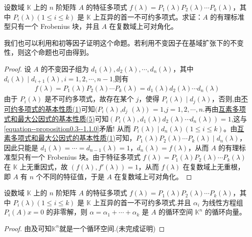 \documentclass[../../main.tex]{subfiles}
\begin{document}
\begin{proposition}\label{proposition:特征多项式在数域K上的不可约分解则在复数域上可对角化}
设数域 $\mathbb{K}$ 上的 $n$ 阶矩阵 $A$ 的特征多项式 $f(\lambda)=P_1(\lambda)P_2(\lambda)\cdots P_k(\lambda)$，其中 $P_i(\lambda) (1\leq i\leq k)$ 是 $\mathbb{K}$ 上互异的首一不可约多项式。求证：$A$ 的有理标准型只有一个 Frobenius 块，并且 $A$ 在复数域上可对角化。
\end{proposition}
\begin{remark}
我们也可以利用和初等因子证明这个命题。若利用不变因子在基域扩张下的不变性，则这个命题也可由得到。
\end{remark}
\begin{proof}
设 $A$ 的不变因子组为 $d_1(\lambda),d_2(\lambda),\cdots,d_n(\lambda)$，其中$d_{i}(\lambda)\mid d_{i+1}(\lambda),i=1,2,\cdots,n-1$,则有
\begin{align}\label{equation--proposition0.3--1.1.0}
f(\lambda)=P_1(\lambda)P_2(\lambda)\cdots P_k(\lambda)=d_1(\lambda)d_2(\lambda)\cdots d_n(\lambda)
\end{align}
由于 $P_i(\lambda)$ 是不可约多项式，故存在某个 $j$，使得 $P_i(\lambda)\mid d_j(\lambda)$，否则,由\hyperref[proposition:不可约多项式的基本性质]{不可约多项式的基本性质(1)}可知$(P_i(\lambda)$,$d_j$ $(\lambda))$ $=1$,$j=1,2,\cdots,n$.再由\hyperref[proposition:互素多项式和最大公因式的基本性质]{互素多项式和最大公因式的基本性质(5)}可知$(P_i(\lambda),d_1(\lambda)d_2(\lambda)\cdots d_n(\lambda))=1$,这与\eqref{equation--proposition0.3--1.1.0}矛盾!
从而 $P_i(\lambda)\mid d_n(\lambda) (1\leq i\leq k)$。由\hyperref[proposition:互素多项式和最大公因式的基本性质]{互素多项式和最大公因式的基本性质(1)}可知，$P_1(\lambda)P_2(\lambda)\cdots P_k(\lambda)\mid d_n(\lambda)$，因此只能是 $d_1(\lambda)=\cdots = d_{n - 1}(\lambda)=1$，$d_n(\lambda)=f(\lambda)$，从而 $A$ 的有理标准型只有一个 Frobenius 块。由于特征多项式 $f(\lambda)=P_1(\lambda)P_2(\lambda)\cdots P_k(\lambda)$ 在 $\mathbb{K}$ 上无重因式，故 $(f(\lambda),f'(\lambda)) = 1$，从而 $f(\lambda)$ 在复数域上无重根，即 $A$ 有 $n$ 个不同的特征值，于是 $A$ 在复数域上可对角化。
\end{proof}

\begin{corollary}
设数域 $\mathbb{K}$ 上的 $n$ 阶矩阵 $A$ 的特征多项式 $f(\lambda)=P_1(\lambda)P_2(\lambda)\cdots P_k(\lambda)$，其中 $P_i(\lambda) (1\leq i\leq k)$ 是 $\mathbb{K}$ 上互异的首一不可约多项式.并且 $\alpha_i$ 为线性方程组 $P_i(A)x = 0$ 的非零解，则 $\alpha=\alpha_1 + \cdots + \alpha_k$ 是 $A$ 的循环空间 $\mathbb{K}^n$ 的循环向量。
\end{corollary}
\begin{proof}
由及可知$\mathbb{K}^n$就是一个循环空间.(未完成证明)
\end{proof}
\end{document}
